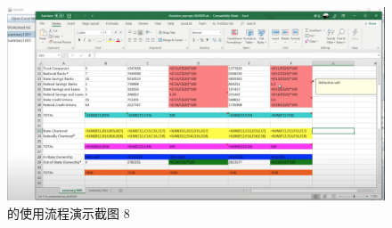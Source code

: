 \begin{figure}[tbp]    
    \centering
    \includegraphics[width=\textwidth]{figure/sg/sguard-8.png}
    \caption{\sg 的使用流程演示截图 8}
    \label{figure-sg8}
\end{figure}